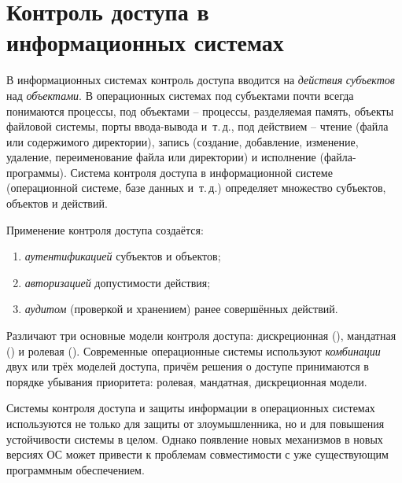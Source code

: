 \section[Контроль доступа в ИС]{Контроль доступа в \protect\\ информационных системах}


В информационных системах контроль доступа вводится на \emph{действия} \emph{субъектов} над \emph{объектами}. В операционных системах под субъектами почти всегда понимаются процессы, под объектами -- процессы, разделяемая память, объекты файловой системы, порты ввода-вывода и~т.\,д., под действием -- чтение (файла или содержимого директории), запись (создание, добавление, изменение, удаление, переименование файла или директории) и исполнение (файла-программы). Система контроля доступа в информационной системе (операционной системе, базе данных и~т.\,д.) определяет множество субъектов, объектов и действий.

Применение контроля доступа создаётся:

\begin{enumerate}
	\item \emph{аутентификацией} субъектов и объектов;
	\item \emph{авторизацией} допустимости действия;
	\item \emph{аудитом} (проверкой и хранением) ранее совершённых действий.
\end{enumerate}

Различают три основные модели контроля доступа: дискреционная (), мандатная () и ролевая (). Современные операционные системы используют \emph{комбинации} двух или трёх моделей доступа, причём решения о доступе принимаются в порядке убывания приоритета: ролевая, мандатная, дискреционная модели.

Системы контроля доступа и защиты информации в операционных системах используются не только для защиты от злоумышленника, но и для повышения устойчивости системы в целом. Однако появление новых механизмов в новых версиях ОС может привести к проблемам совместимости с уже существующим программным обеспечением.

